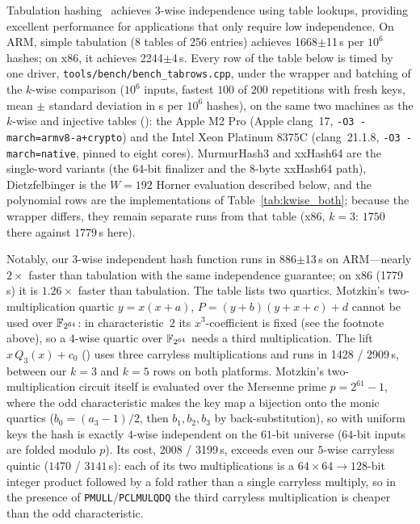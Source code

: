 Tabulation hashing~\cite{patracscu2012power} achieves 3-wise independence using
table lookups, providing excellent performance for applications that only require
low independence.
On ARM, simple tabulation (8 tables of 256 entries) achieves
1668$\pm$11\,\textmu s per $10^6$ hashes; on x86, it achieves 2244$\pm$4\,\textmu s.
Every row of the table below is timed by one driver,
\texttt{tools/bench/bench\_tabrows.cpp}, under the wrapper and batching of the
$k$-wise comparison ($10^6$ inputs, fastest $100$ of $200$ repetitions with
fresh keys, mean $\pm$ standard deviation in \textmu s per $10^6$ hashes), on the
same two machines as the $k$-wise and injective tables
(): the Apple M2 Pro (Apple clang~17,
\texttt{-O3 -march=armv8-a+crypto}) and the Intel Xeon Platinum 8375C
(clang~21.1.8, \texttt{-O3 -march=native}, pinned to eight cores).
MurmurHash3 and xxHash64 are the single-word variants (the 64-bit finalizer and
the 8-byte xxHash64 path), Dietzfelbinger is the $W=192$ Horner evaluation
described below, and the polynomial rows are the implementations of
Table~\ref{tab:kwise_both}; because the wrapper differs, they remain separate
runs from that table (x86, $k=3$: $1750$ there against $1779$\,\textmu s here).

Notably, our 3-wise independent hash function runs in 886$\pm$13\,\textmu s on
ARM---nearly $2\times$ faster than tabulation with the same independence
guarantee; on x86 (1779\,\textmu s) it is $1.26\times$ faster than tabulation.
The table lists two quartics.  Motzkin's two-multiplication quartic
$y = x(x+a)$, $P=(y+b)(y+x+c)+d$ cannot be used over $\mathbb{F}_{2^{64}}$: in
characteristic~$2$ its $x^3$-coefficient is fixed (see the footnote above),
so a $4$-wise quartic over $\mathbb{F}_{2^{64}}$ needs a third multiplication.  The
lift $x\,Q_3(x)+c_0$ () uses three carryless
multiplications and runs in 1428 / 2909\,\textmu s, between our $k=3$ and $k=5$
rows on both platforms.  Motzkin's two-multiplication circuit itself is
evaluated over the Mersenne prime $p=2^{61}-1$, where the odd
characteristic makes the key map a bijection onto the monic quartics
($b_0=(a_3-1)/2$, then $b_1,b_2,b_3$ by back-substitution), so with uniform keys
the hash is exactly $4$-wise independent on the $61$-bit universe ($64$-bit
inputs are folded modulo $p$).  Its cost, 2008 / 3199\,\textmu s, exceeds even
our $5$-wise carryless quintic ($1470$ / $3141$\,\textmu s): each of its two
multiplications is a $64\times 64\to 128$-bit integer product followed by a
fold rather than a single carryless multiply, so in the presence of
\texttt{PMULL}/\texttt{PCLMULQDQ} the third carryless multiplication is cheaper
than the odd characteristic.

